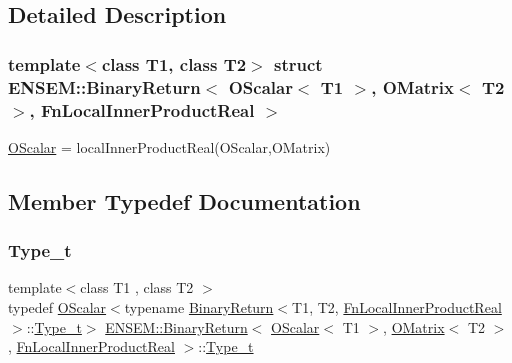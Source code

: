 \subsection{Detailed Description}
\subsubsection*{template$<$class T1, class T2$>$\newline
struct E\+N\+S\+E\+M\+::\+Binary\+Return$<$ O\+Scalar$<$ T1 $>$, O\+Matrix$<$ T2 $>$, Fn\+Local\+Inner\+Product\+Real $>$}

\mbox{\hyperlink{classENSEM_1_1OScalar}{O\+Scalar}} = local\+Inner\+Product\+Real(\+O\+Scalar,\+O\+Matrix) 

\subsection{Member Typedef Documentation}
\mbox{\label{structENSEM_1_1BinaryReturn_3_01OScalar_3_01T1_01_4_00_01OMatrix_3_01T2_01_4_00_01FnLocalInnerProductReal_01_4_a7979f0e65a026ed5c70cf4ad2aab4ebe}} 
\subsubsection{\texorpdfstring{Type\_t}{Type\_t}\hspace{0.1cm}{\footnotesize\ttfamily [1/2]}}
{\footnotesize\ttfamily template$<$class T1 , class T2 $>$ \\
typedef \mbox{\hyperlink{classENSEM_1_1OScalar}{O\+Scalar}}$<$typename \mbox{\hyperlink{structENSEM_1_1BinaryReturn}{Binary\+Return}}$<$T1, T2, \mbox{\hyperlink{structENSEM_1_1FnLocalInnerProductReal}{Fn\+Local\+Inner\+Product\+Real}}$>$\+::\mbox{\hyperlink{structENSEM_1_1BinaryReturn_3_01OScalar_3_01T1_01_4_00_01OMatrix_3_01T2_01_4_00_01FnLocalInnerProductReal_01_4_a7979f0e65a026ed5c70cf4ad2aab4ebe}{Type\+\_\+t}}$>$ \mbox{\hyperlink{structENSEM_1_1BinaryReturn}{E\+N\+S\+E\+M\+::\+Binary\+Return}}$<$ \mbox{\hyperlink{classENSEM_1_1OScalar}{O\+Scalar}}$<$ T1 $>$, \mbox{\hyperlink{classENSEM_1_1OMatrix}{O\+Matrix}}$<$ T2 $>$, \mbox{\hyperlink{structENSEM_1_1FnLocalInnerProductReal}{Fn\+Local\+Inner\+Product\+Real}} $>$\+::\mbox{\hyperlink{structENSEM_1_1BinaryReturn_3_01OScalar_3_01T1_01_4_00_01OMatrix_3_01T2_01_4_00_01FnLocalInnerProductReal_01_4_a7979f0e65a026ed5c70cf4ad2aab4ebe}{Type\+\_\+t}}}

